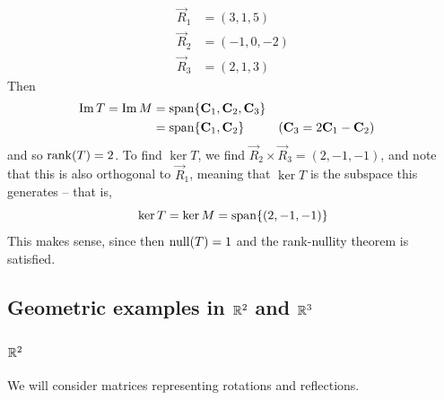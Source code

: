 \documentclass{../template/note}
\begin{document}
\begin{example}
\begin{itemize}
\begin{align*}
                \vec R_1 &= (3, 1, 5) \\
                \vec R_2 &= (-1, 0, -2) \\
                \vec R_3 &= (2, 1, 3)
            \end{align*}
            Then 
            \begin{align*}
                \Im T = \Im M &= \Span\{\vec C_1, \vec C_2, \vec C_3\} \\
                &= \Span\{\vec C_1, \vec C_2\} && (\vec C_3 = 2 \vec C_1 - \vec C_2)
            \end{align*}
            and so \(\operatorname{rank}(T) = 2\). To find \(\ker T\), we find \(\vec R_2 \times \vec R_3 = (2, -1, -1)\), and note that this is also orthogonal to \(\vec R_1\), meaning that \(\ker T\) is the subspace this generates -- that is,
            \[
                \ker T = \ker M = \operatorname{span} \{(2, -1, -1)\}
            \]
            This makes sense, since then \(\operatorname{null}(T) = 1\) and the rank-nullity theorem is satisfied.
            
        \end{itemize}
        
        
    \end{example}
    
    \subsection{Geometric examples in \(\mathbb R^2\) and \(\mathbb R^3\)}

    \subsubsection{\(\mathbb R^2\)}

    We will consider matrices representing rotations and reflections.
\end{document}
